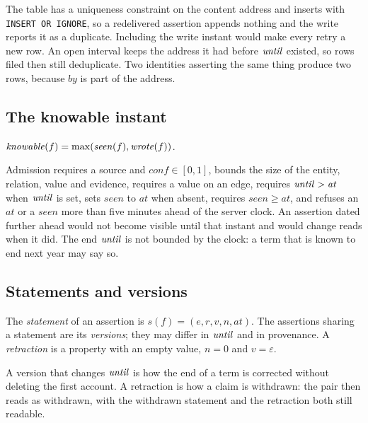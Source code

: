 The table has a uniqueness constraint on the content address and inserts with
\texttt{INSERT OR IGNORE}, so a redelivered assertion appends nothing and the
write reports it as a duplicate. Including the write instant would make every
retry a new row. An open interval keeps the address it had before $\mathit{until}$
existed, so rows filed then still deduplicate. Two identities asserting the same
thing produce two rows, because $\mathit{by}$ is part of the address.

\subsection{The knowable instant}

\begin{definition}[Knowable]
$\mathit{knowable}(f) = \max(\mathit{seen}(f), \mathit{wrote}(f))$.
\end{definition}

\shipped{} Admission requires a source and $\mathit{conf} \in [0,1]$, bounds the
size of the entity, relation, value and evidence, requires a value on an edge,
requires $\mathit{until} > \mathit{at}$ when $\mathit{until}$ is set, sets $\mathit{seen}$ to
$\mathit{at}$ when absent, requires $\mathit{seen} \ge \mathit{at}$, and refuses
an $\mathit{at}$ or a $\mathit{seen}$ more than five minutes ahead of the server
clock. An assertion dated further ahead would not become visible until that
instant and would change reads when it did. The end $\mathit{until}$ is not bounded
by the clock: a term that is known to end next year may say so.

\subsection{Statements and versions}

\begin{definition}
The \emph{statement} of an assertion is $s(f) = (e, r, v, n, \mathit{at})$. The
assertions sharing a statement are its \emph{versions}; they may differ in
$\mathit{until}$ and in provenance. A \emph{retraction} is a property with an empty
value, $n = 0$ and $v = \varepsilon$.
\end{definition}

A version that changes $\mathit{until}$ is how the end of a term is corrected without
deleting the first account. A retraction is how a claim is withdrawn: the pair
then reads as withdrawn, with the withdrawn statement and the retraction both
still readable.

